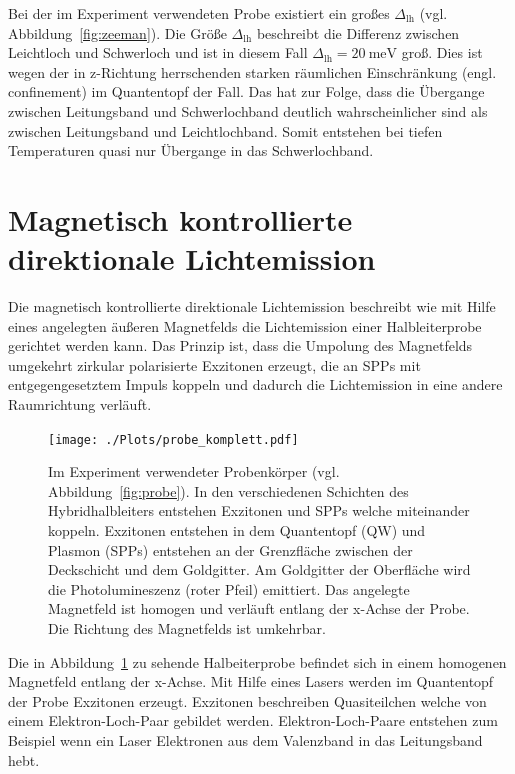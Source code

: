 Bei der im Experiment verwendeten Probe existiert ein großes $\Delta_\text{lh}$ (vgl. Abbildung~\ref{fig:zeeman}).
Die Größe $\Delta_\text{lh}$ beschreibt die Differenz zwischen Leichtloch und Schwerloch und ist
in diesem Fall $\Delta_\text{lh}= \SI{20}{\milli\eV}$ groß.
Dies ist wegen der in z-Richtung herrschenden starken räumlichen Einschränkung (engl. confinement) im Quantentopf der Fall.
Das hat zur Folge, dass die Übergange zwischen Leitungsband und Schwerlochband deutlich
wahrscheinlicher sind als zwischen Leitungsband und Leichtlochband. Somit entstehen bei tiefen Temperaturen quasi nur 
Übergange in das Schwerlochband.


\section{Magnetisch kontrollierte direktionale Lichtemission}\label{sec:pl}
Die magnetisch kontrollierte direktionale Lichtemission
beschreibt wie mit Hilfe eines angelegten äußeren Magnetfelds die Lichtemission
einer Halbleiterprobe gerichtet werden kann.
Das Prinzip ist, dass die Umpolung des Magnetfelds 
umgekehrt zirkular polarisierte Exzitonen erzeugt, die an SPPs mit entgegengesetztem Impuls 
koppeln und dadurch die Lichtemission in eine andere Raumrichtung verläuft.
\begin{figure}
    \centering
    \texttt{[image: ./Plots/probe\_komplett.pdf]}
    \caption{Im Experiment verwendeter Probenkörper (vgl. Abbildung~\ref{fig:probe}).
    In den verschiedenen Schichten des Hybridhalbleiters entstehen Exzitonen und SPPs 
    welche miteinander koppeln. 
    Exzitonen entstehen in dem Quantentopf (QW) und Plasmon (SPPs) entstehen an der Grenzfläche
    zwischen der Deckschicht und dem Goldgitter.
    Am Goldgitter der Oberfläche wird die Photolumineszenz (roter Pfeil)
    emittiert. 
    Das angelegte Magnetfeld ist homogen und verläuft entlang der x-Achse der Probe.
    Die Richtung des Magnetfelds ist umkehrbar.}
    \label{fig:komplett}
\end{figure}
\FloatBarrier

Die in Abbildung~\ref{fig:komplett} zu sehende Halbeiterprobe befindet sich 
in einem homogenen Magnetfeld entlang der x-Achse.
Mit Hilfe eines Lasers werden im Quantentopf der Probe Exzitonen erzeugt.
Exzitonen beschreiben Quasiteilchen welche von einem Elektron-Loch-Paar gebildet werden.
Elektron-Loch-Paare entstehen zum Beispiel wenn ein Laser 
Elektronen aus dem Valenzband in das Leitungsband hebt.\cite{jens}

